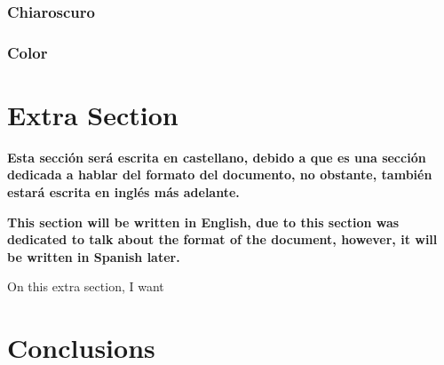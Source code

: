 \documentclass{cup-pan}
\begin{document}
        \subsubsection{Chiaroscuro}
            
        \subsubsection{Color}
            
    \newpage
\newpage

\section{Extra Section}

\textbf{Esta sección será escrita en castellano, debido a que es una sección dedicada a hablar del formato del documento, no obstante, también estará escrita en inglés más adelante.\\}

\textbf{This section will be written in English, due to this section was dedicated to talk about the format of the document, however, it will be written in Spanish later.\\}

On this extra section, I want 

\section{Conclusions}

\newpage
\end{document}
